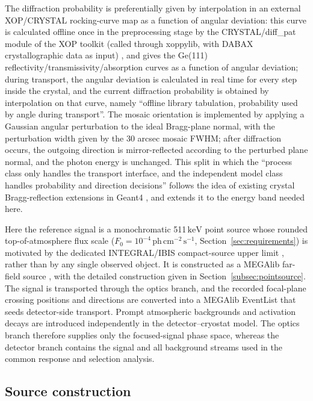 \documentclass[11pt]{article}
\newcommand{\keV}{\ensuremath{\,\mathrm{keV}}}
\newcommand{\phcms}{\ensuremath{\,\mathrm{ph\,cm^{-2}\,s^{-1}}}}
\newcommand{\fzero}{F_{0}}
\begin{document}
The diffraction probability is preferentially given by interpolation in an external XOP/CRYSTAL rocking-curve map as a function of angular deviation: this curve is calculated offline once in the preprocessing stage by the CRYSTAL/diff\_pat module of the XOP toolkit (called through xoppylib, with DABAX crystallographic data as input) \cite{SanchezDelRio2011XOP}, and gives the Ge(111) reflectivity/transmissivity/absorption curves as a function of angular deviation; during transport, the angular deviation is calculated in real time for every step inside the crystal, and the current diffraction probability is obtained by interpolation on that curve, namely ``offline library tabulation, probability used by angle during transport''. The mosaic orientation is implemented by applying a Gaussian angular perturbation to the ideal Bragg-plane normal, with the perturbation width given by the 30 arcsec mosaic FWHM; after diffraction occurs, the outgoing direction is mirror-reflected according to the perturbed plane normal, and the photon energy is unchanged. This split in which the ``process class only handles the transport interface, and the independent model class handles probability and direction decisions'' follows the idea of existing crystal Bragg-reflection extensions in Geant4 \cite{Guan2023BraggReflection,Reiazi2025G4BraggReflection}, and extends it to the energy band needed here.

Here the reference signal is a monochromatic 511\keV{} point source whose
rounded top-of-atmosphere flux scale
($\fzero=10^{-4}\phcms$, Section~\ref{sec:requirements}) is motivated by the
dedicated INTEGRAL/IBIS compact-source upper limit \cite{DeCesare2011}, rather
than by any single observed object. It is constructed as a MEGAlib far-field source
\cite{Zoglauer2006}, with the detailed construction given in
Section~\ref{subsec:pointsource}. The signal is transported through the optics
branch, and the recorded focal-plane crossing positions and directions are
converted into a MEGAlib EventList that seeds detector-side transport. Prompt
atmospheric backgrounds and activation decays are introduced independently in
the detector--cryostat model. The optics branch therefore supplies only the
focused-signal phase space, whereas the detector branch contains the signal and
all background streams used in the common response and selection analysis.

\subsection{Source construction}
\label{sec:background}
\end{document}
